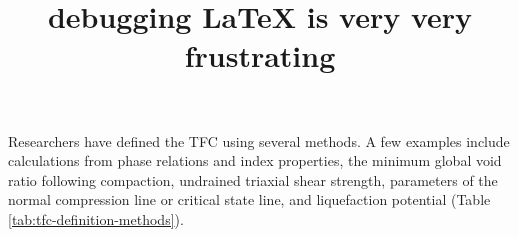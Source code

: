 \documentclass[
]{article}
\title{debugging \LaTeX{} is very very frustrating}
\author{}
\date{\vspace{-2.5em}}
\begin{document}
\maketitle

{
\setcounter{tocdepth}{2}
\tableofcontents
}
Researchers have defined the TFC using several methods. A few examples include calculations from phase relations and index properties, the minimum global void ratio following compaction, undrained triaxial shear strength, parameters of the normal compression line or critical state line, and liquefaction potential (Table \ref{tab:tfc-definition-methods}).

\begin{table}

\caption[Selected studies on transitional fines content (TFC)]{\label{tab:tfc-definition-methods}Transitional fines content values vary widely but often lie between 20-30\% by mass.}
\centering
{}
\end{table}
\end{document}
